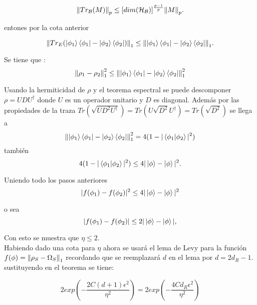 \begin{equation}
\norm{Tr_{\mathcal{B}}(M)}_{p} \le [dim(\mathcal{H_{B}})]^{\frac{p-1}{p}} \norm{M}_{p}.
\end{equation}

entones por la cota anterior

\begin{equation}
\norm{Tr_{E}(\ket{\phi_{1}} \bra{\phi_{1}}-\ket{\phi_{2}} \bra{\phi_{2}})}_{1} \le \norm{\ket{\phi_{1}} \bra{\phi_{1}}-\ket{\phi_{2}} \bra{\phi_{2}}}_{1}.
\end{equation}

Se tiene que :
\begin{equation}
\norm{\rho_{1}- \rho_{2} }_{1}^2 \le \norm{\ket{\phi_{1}} \bra{\phi_{1}}-\ket{\phi_{2}} \bra{\phi_{2}}}_{1}^{2}
\end{equation}

Usando la hermiticidad de $\rho$ y el teorema espectral se puede descomponer $\rho= UDU^{\dag}$ donde $U$ es un operador unitario y $D$ es diagonal. Además por las propiedades de la traza $Tr(\sqrt{UD^2U^{\dag}})= Tr(U\sqrt{D^2}U^{\dag})= Tr(\sqrt{D^{2}})$ se llega a
\begin{equation}
\norm{\ket{\phi_{1}} \bra{\phi_{1}}-\ket{\phi_{2}} \bra{\phi_{2}}}_{1}^{2} = 4(1-|\bra{\phi_{1}} \ket{\phi_{2}}|^{2})
\end{equation}
también
\begin{equation}
 4(1-|\bra{\phi_{1}} \ket{\phi_{2}}|^{2}) \le 4|\ket{\phi}-\ket{\phi}|^2.
\end{equation}

Uniendo todo los pasos anteriores
\begin{equation}
|f(\phi_{1})-f(\phi_{2})|^{2} \le  4|\ket{\phi}-\ket{\phi}|^2
\end{equation}

o sea 
\begin{equation}
|f(\phi_{1})-f(\phi_{2})| \le  2|\ket{\phi}-\ket{\phi}|,
\end{equation}

Con esto se muestra que $\eta \le 2$.\\

Habiendo dado una cota para $\eta$ ahora se usará el lema de Levy para la función $f(\phi)=\norm{\rho_{S} -\Omega_{S}}_{1}$ recordando que se reemplazará $d$ en el lema por $d=2d_{R}-1$. sustituyendo en el teorema se tiene:

\begin{equation}
 2exp(-\frac{2C(d+1)\epsilon^2}{\eta^2})= 2exp(-\frac{4Cd_{R}\epsilon^2}{\eta^2})
\end{equation}

